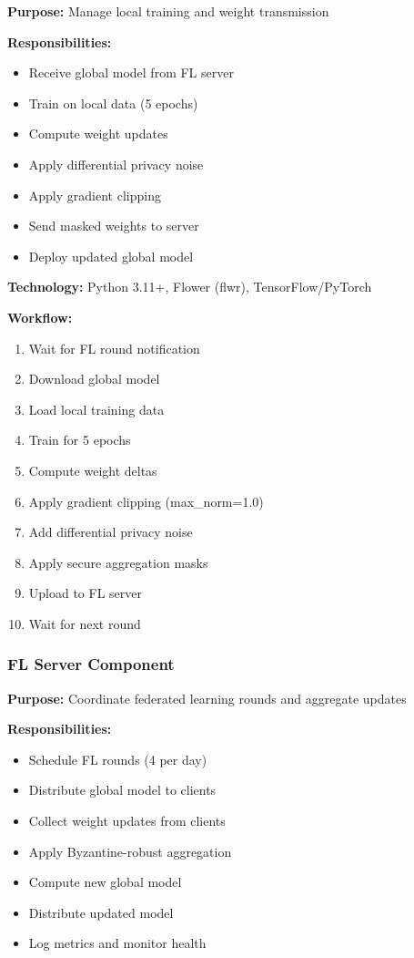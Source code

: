 \documentclass[12pt,a4paper]{article}
\begin{document}
\textbf{Purpose:} Manage local training and weight transmission

\textbf{Responsibilities:}
\begin{itemize}[leftmargin=1cm,itemsep=0pt]
    \item Receive global model from FL server
    \item Train on local data (5 epochs)
    \item Compute weight updates
    \item Apply differential privacy noise
    \item Apply gradient clipping
    \item Send masked weights to server
    \item Deploy updated global model
\end{itemize}

\textbf{Technology:} Python 3.11+, Flower (flwr), TensorFlow/PyTorch

\textbf{Workflow:}
\begin{enumerate}[leftmargin=1cm,itemsep=0pt]
    \item Wait for FL round notification
    \item Download global model
    \item Load local training data
    \item Train for 5 epochs
    \item Compute weight deltas
    \item Apply gradient clipping (max\_norm=1.0)
    \item Add differential privacy noise
    \item Apply secure aggregation masks
    \item Upload to FL server
    \item Wait for next round
\end{enumerate}

\subsubsection{FL Server Component}

\textbf{Purpose:} Coordinate federated learning rounds and aggregate updates

\textbf{Responsibilities:}
\begin{itemize}[leftmargin=1cm,itemsep=0pt]
    \item Schedule FL rounds (4 per day)
    \item Distribute global model to clients
    \item Collect weight updates from clients
    \item Apply Byzantine-robust aggregation
    \item Compute new global model
    \item Distribute updated model
    \item Log metrics and monitor health
\end{itemize}
\end{document}
